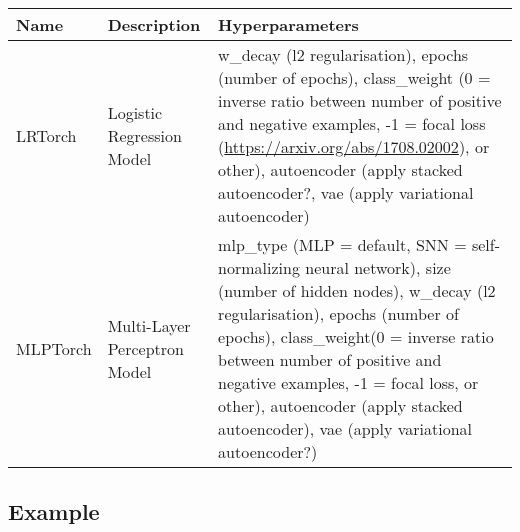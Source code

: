 \documentclass[]{article}
\begin{document}
\begin{longtable}[]{@{}lll@{}}
\toprule
\begin{minipage}[b]{0.11\columnwidth}\raggedright\strut
Name\strut
\end{minipage} & \begin{minipage}[b]{0.34\columnwidth}\raggedright\strut
Description\strut
\end{minipage} & \begin{minipage}[b]{0.46\columnwidth}\raggedright\strut
Hyperparameters\strut
\end{minipage}\tabularnewline
\midrule
\endhead
\begin{minipage}[t]{0.11\columnwidth}\raggedright\strut
LRTorch\strut
\end{minipage} & \begin{minipage}[t]{0.34\columnwidth}\raggedright\strut
Logistic Regression Model\strut
\end{minipage} & \begin{minipage}[t]{0.46\columnwidth}\raggedright\strut
w\_decay (l2 regularisation), epochs (number of epochs), class\_weight
(0 = inverse ratio between number of positive and negative examples, -1
= focal loss (\url{https://arxiv.org/abs/1708.02002}), or other),
autoencoder (apply stacked autoencoder?, vae (apply variational
autoencoder)\strut
\end{minipage}\tabularnewline
\begin{minipage}[t]{0.11\columnwidth}\raggedright\strut
MLPTorch\strut
\end{minipage} & \begin{minipage}[t]{0.34\columnwidth}\raggedright\strut
Multi-Layer Perceptron Model\strut
\end{minipage} & \begin{minipage}[t]{0.46\columnwidth}\raggedright\strut
mlp\_type (MLP = default, SNN = self-normalizing neural network), size
(number of hidden nodes), w\_decay (l2 regularisation), epochs (number
of epochs), class\_weight(0 = inverse ratio between number of positive
and negative examples, -1 = focal loss, or other), autoencoder (apply
stacked autoencoder), vae (apply variational autoencoder?)\strut
\end{minipage}\tabularnewline
\bottomrule
\end{longtable}

\subsection{Example}\label{example}
\end{document}
